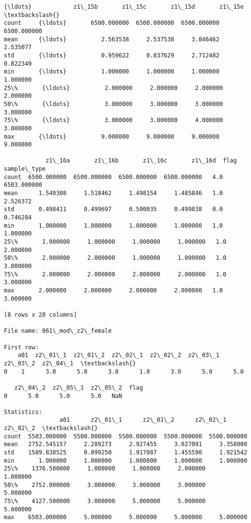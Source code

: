 \documentclass[11pt]{article}
\begin{document}
\begin{Verbatim}[commandchars=\\\{\}]
          {\ldots}            z1\_15b       z1\_15c       z1\_15d       z1\_15e  \textbackslash{}
count     {\ldots}       6500.000000  6500.000000  6500.000000  6500.000000   
mean      {\ldots}          2.563538     2.537538     3.846462     2.535077   
std       {\ldots}          0.959622     0.837629     2.712482     0.822349   
min       {\ldots}          1.000000     1.000000     1.000000     1.000000   
25\%       {\ldots}          2.000000     2.000000     2.000000     2.000000   
50\%       {\ldots}          3.000000     3.000000     3.000000     3.000000   
75\%       {\ldots}          3.000000     3.000000     4.000000     3.000000   
max       {\ldots}          9.000000     9.000000     9.000000     9.000000   

            z1\_16a       z1\_16b       z1\_16c       z1\_16d  flag  sample\_type  
count  6500.000000  6500.000000  6500.000000  6500.000000   4.0  6503.000000  
mean      1.540308     1.518462     1.498154     1.485846   1.0     2.526372  
std       0.498411     0.499697     0.500035     0.499838   0.0     0.746284  
min       1.000000     1.000000     1.000000     1.000000   1.0     1.000000  
25\%       1.000000     1.000000     1.000000     1.000000   1.0     2.000000  
50\%       2.000000     2.000000     1.000000     1.000000   1.0     3.000000  
75\%       2.000000     2.000000     2.000000     2.000000   1.0     3.000000  
max       2.000000     2.000000     2.000000     2.000000   1.0     3.000000  

[8 rows x 28 columns]

File name: 061\_mod\_z2\_female

First row: 
    a01  z2\_01\_1  z2\_01\_2  z2\_02\_1  z2\_02\_2  z2\_03\_1  z2\_03\_2  z2\_04\_1  \textbackslash{}
0    1      3.0      5.0      3.0      1.0      3.0      5.0      5.0   

   z2\_04\_2  z2\_05\_1  z2\_05\_2  flag  
0      5.0      5.0      5.0   NaN  

Statistics: 
                a01      z2\_01\_1      z2\_01\_2      z2\_02\_1      z2\_02\_2  \textbackslash{}
count  5503.000000  5500.000000  5500.000000  5500.000000  5500.000000   
mean   2752.545157     2.289273     2.927455     3.027091     3.358000   
std    1589.838525     0.899250     1.917087     1.455590     1.921542   
min       1.000000     1.000000     1.000000     1.000000     1.000000   
25\%    1376.500000     1.000000     1.000000     2.000000     1.000000   
50\%    2752.000000     3.000000     3.000000     3.000000     5.000000   
75\%    4127.500000     3.000000     5.000000     5.000000     5.000000   
max    6503.000000     5.000000     5.000000     5.000000     5.000000   


\end{Verbatim}
\end{document}
